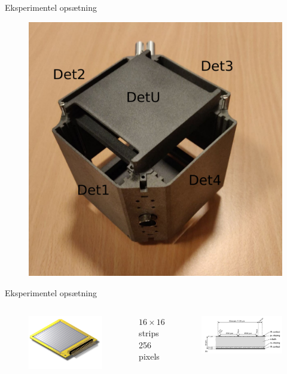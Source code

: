\begin{frame}{Eksperimentel opsætning}
	\begin{figure}
		\centering
		\includegraphics[width=.5\columnwidth]{../figures/cubepic.pdf}
	\end{figure}
\end{frame}

\begin{frame}{Eksperimentel opsætning}
	\begin{columns}
		\begin{figure}
			\centering
			\includegraphics[width=\columnwidth]{../figures/W1.jpg}
		\end{figure}
		$16\times16$ strips\\
		256 pixels 
		\begin{figure}
			\centering
			\includegraphics[width=\columnwidth]{../figures/dope.png}
		\end{figure}
	\end{columns}
\end{frame}

